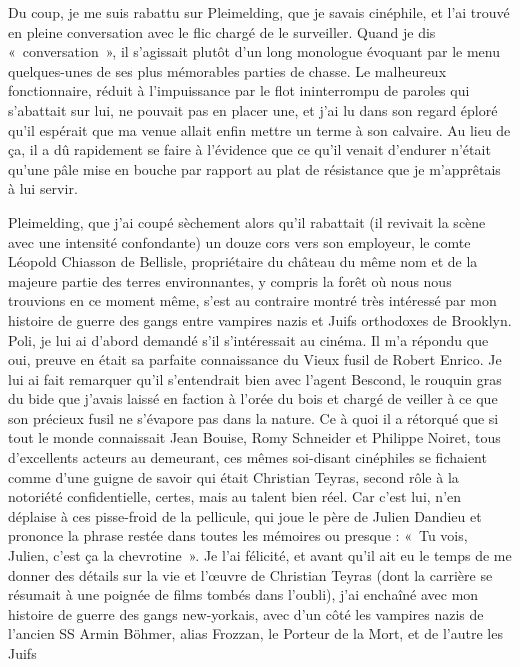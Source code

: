 Du coup, je me suis rabattu sur Pleimelding, que je savais cinéphile, et l’ai trouvé en pleine conversation avec le flic chargé de le surveiller. Quand je dis «~conversation~», il s’agissait plutôt d’un long monologue évoquant par le menu quelques-unes de ses plus mémorables parties de chasse. Le malheureux fonctionnaire, réduit à l’impuissance par le flot ininterrompu de paroles qui s’abattait sur lui, ne pouvait pas en placer une, et j’ai lu dans son regard éploré qu’il espérait que ma venue allait enfin mettre un terme à son calvaire. Au lieu de ça, il a dû rapidement se faire à l’évidence que ce qu’il venait d’endurer n’était qu’une pâle mise en bouche par rapport au plat de résistance que je m’apprêtais à lui servir.

%
Pleimelding, que j’ai coupé sèchement alors qu’il rabattait (il revivait la scène avec une intensité confondante) un douze cors vers son employeur, le comte Léopold Chiasson de Bellisle, propriétaire du château du même nom et de la majeure partie des terres environnantes, y compris la forêt où nous nous trouvions en ce moment même, s’est au contraire montré très intéressé par mon histoire de guerre des gangs entre vampires nazis et Juifs orthodoxes de Brooklyn. Poli, je lui ai d’abord demandé s’il s’intéressait au cinéma. Il m’a répondu que oui, preuve en était sa parfaite connaissance du Vieux fusil de Robert Enrico. Je lui ai fait remarquer qu’il s’entendrait bien avec l’agent Bescond, le rouquin gras du bide que j’avais laissé en faction à l’orée du bois et chargé de veiller à ce que son précieux fusil ne s’évapore pas dans la nature. Ce à quoi il a rétorqué que si tout le monde connaissait Jean Bouise, Romy Schneider et Philippe Noiret, tous d’excellents acteurs au demeurant, ces mêmes soi-disant cinéphiles se fichaient comme d’une guigne de savoir qui était Christian Teyras, second rôle à la notoriété confidentielle, certes, mais au talent bien réel. Car c’est lui, n’en déplaise à ces pisse-froid de la pellicule, qui joue le père de Julien Dandieu et prononce la phrase restée dans toutes les mémoires ou presque : «~Tu vois, Julien, c’est ça la chevrotine~». Je l’ai félicité, et avant qu’il ait eu le temps de me donner des détails sur la vie et l’œuvre de Christian Teyras (dont la carrière se résumait à une poignée de films tombés dans l’oubli), j’ai enchaîné avec mon histoire de guerre des gangs new-yorkais, avec d’un côté les vampires nazis de l’ancien SS Armin Böhmer, alias Frozzan, le Porteur de la Mort, et de l’autre les Juifs 